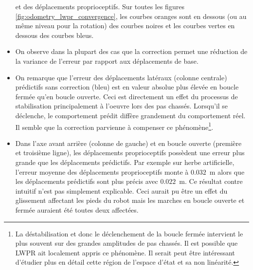 \begin{itemize}
        et des déplacements proprioceptifs.
        Sur toutes les figures \ref{fig:odometry_lwpr_convergence}, 
        les courbes oranges sont en dessous (ou au même niveau
        pour la rotation) des courbes noires et les courbes vertes 
        en dessous des courbes bleus.
    \item On observe dans la plupart des cas que la correction permet 
        une réduction de la variance de l'erreur par rapport aux déplacements de base.
    \item On remarque que l'erreur des déplacements latéraux (colonne centrale) 
        prédictifs sans correction (bleu) est en valeur absolue plus élevée 
        en boucle fermée qu'en boucle ouverte.
        Ceci est directement un effet du processus de stabilisation principalement à l'oeuvre
        lors des pas chassés. Lorsqu'il se déclenche, le comportement prédit diffère grandement
        du comportement réel.
        Il semble que la correction parvienne à compenser ce phénomène\footnote{La déstabilisation
        et donc le déclenchement de la boucle fermée intervient le plus souvent sur 
        des grandes amplitudes de pas chassés. Il est possible que LWPR ait localement 
        appris ce phénomène. Il serait peut être intéressant d'étudier plus en détail cette région
        de l'espace d'état et sa non linéarité.}.
    \item Dans l'axe avant arrière (colonne de gauche) et en boucle ouverte
        (première et troisième ligne), les déplacements proprioceptifs possèdent une
        erreur plus grande que les déplacements prédictifs.
        Par exemple sur herbe artificielle, l'erreur moyenne des déplacements proprioceptifs
        monte à $0.032$~m alors que les déplacements prédictifs sont plus précis avec $0.022$~m.
        Ce résultat contre intuitif n'est pas simplement explicable.
        Ceci aurait pu être un effet du glissement affectant les pieds du robot mais
        les marches en boucle ouverte et fermée auraient été toutes deux affectées.\\
\end{itemize}

